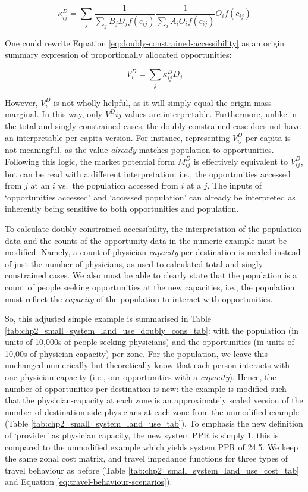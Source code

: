 \documentclass[
11pt, %
oneside, %
english, %
singlespacing, %
]{macthesis} %
\begin{document}
\[
\kappa_{ij}^D = \sum_j \frac{1}{\sum_j B_j D_j f(c_{ij})} \frac{1}{\sum_i A_i O_i f(c_{ij})} O_i f(c_{ij})
\]

One could rewrite Equation \ref{eq:doubly-constrained-accessibility} as an origin summary expression of proportionally allocated opportunities:

\begin{equation}
\label{eq:doubly-constrained-accessibility-w-paf}
V^D_{i} = \sum_j \kappa^D_{ij}  D_j
\end{equation} 

However, \(V^D_{i}\) is not wholly helpful, as it will simply equal the origin-mass marginal. In this way, only \(V^D{ij}\) values are interpretable. Furthermore, unlike in the total and singly constrained cases, the doubly-constrained case does not have an interpretable per capita version. For instance, representing \(V_{ij}^D\) per capita is not meaningful, as the value \emph{already} matches population to opportunities. Following this logic, the market potential form \(M^D_{ij}\) is effectively equivalent to \(V_{ij}^D\), but can be read with a different interpretation: i.e., the opportunities accessed from \(j\) at an \(i\) vs.~the population accessed from \(i\) at a \(j\). The inputs of `opportunities accessed' and `accessed population' can already be interpreted as inherently being sensitive to both opportunities and population.

To calculate doubly constrained accessibility, the interpretation of the population data and the counts of the opportunity data in the numeric example must be modified. Namely, a count of physician \emph{capacity} per destination is needed instead of just the number of physicians, as used to calculated total and singly constrained cases. We also must be able to clearly state that the population is a count of people seeking opportunities at the new capacities, i.e., the population must reflect the \emph{capacity} of the population to interact with opportunities.

So, this adjusted simple example is summarised in Table \ref{tab:chp2_small_system_land_use_doubly_cons_tab}: with the population (in units of 10,000s of people seeking physicians) and the opportunities (in units of 10,00s of physician-capacity) per zone. For the population, we leave this unchanged numerically but theoretically know that each person interacts with one physician capacity (i.e., our opportunities with a \emph{capacity}). Hence, the number of opportunities per destination is new: the example is modified such that the physician-capacity at each zone is an approximately scaled version of the number of destination-side physicians at each zone from the unmodified example (Table \ref{tab:chp2_small_system_land_use_tab}). To emphasis the new definition of `provider' as physician capacity, the new system PPR is simply 1, this is compared to the unmodified example which yields system PPR of 24.5. We keep the same zonal cost matrix, and travel impedance functions for three types of travel behaviour as before (Table \ref {tab:chp2_small_system_land_use_cost_tab} and Equation \ref{eq:travel-behaviour-scenarios}).
\end{document}
